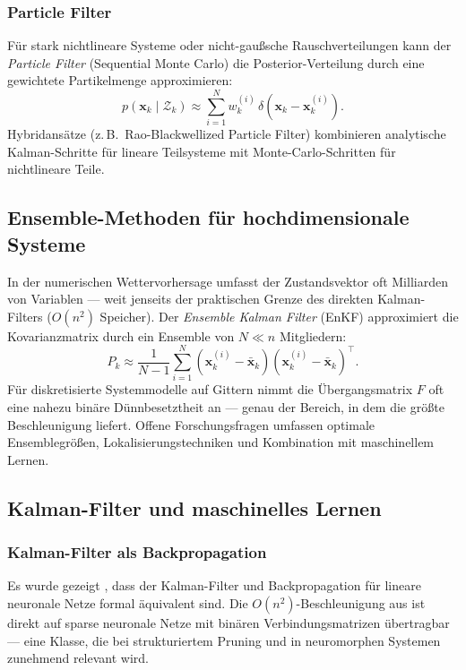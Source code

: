 ﻿\documentclass[a4paper,12pt]{article}
\theoremstyle{definition}
\begin{document}
\subsubsection{Particle Filter}

Für stark nichtlineare Systeme oder nicht-gaußsche Rauschverteilungen kann der
\emph{Particle Filter} (Sequential Monte Carlo) \cite{doucet2001} die Posterior-Verteilung
durch eine gewichtete Partikelmenge approximieren:
\[
    p(\mathbf{x}_k \mid \mathcal{Z}_k) \approx \sum_{i=1}^N w_k^{(i)}\,
    \delta(\mathbf{x}_k - \mathbf{x}_k^{(i)}).
\]
Hybridansätze (z.\,B.\ Rao-Blackwellized Particle Filter) kombinieren analytische
Kalman-Schritte für lineare Teilsysteme mit Monte-Carlo-Schritten für nichtlineare Teile.

\subsection{Ensemble-Methoden für hochdimensionale Systeme}

In der numerischen Wettervorhersage umfasst der Zustandsvektor oft Milliarden von
Variablen --- weit jenseits der praktischen Grenze des direkten Kalman-Filters
($O(n^2)$ Speicher). Der \emph{Ensemble Kalman Filter} (EnKF) \cite{evensen1994, evensen2003}
approximiert die Kovarianzmatrix durch ein Ensemble von $N \ll n$ Mitgliedern:
\[
    P_k \approx \frac{1}{N-1}\sum_{i=1}^N (\mathbf{x}_k^{(i)} - \bar{\mathbf{x}}_k)
                                           (\mathbf{x}_k^{(i)} - \bar{\mathbf{x}}_k)^\top.
\]
Für diskretisierte Systemmodelle auf Gittern nimmt die Übergangsmatrix $F$ oft eine
nahezu binäre Dünnbesetztheit an --- genau der Bereich, in dem \cite{epp2026boolmm}
die größte Beschleunigung liefert. Offene Forschungsfragen umfassen optimale
Ensemblegrößen, Lokalisierungstechniken und Kombination mit maschinellem Lernen.

\subsection{Kalman-Filter und maschinelles Lernen}

\subsubsection{Kalman-Filter als Backpropagation}

Es wurde gezeigt \cite{ollivier2018}, dass der Kalman-Filter und Backpropagation für
lineare neuronale Netze formal äquivalent sind. Die $O(n^2)$-Beschleunigung aus
\cite{epp2026boolmm} ist direkt auf sparse neuronale Netze mit binären
Verbindungsmatrizen übertragbar --- eine Klasse, die bei strukturiertem Pruning
und in neuromorphen Systemen zunehmend relevant wird.
\end{document}
